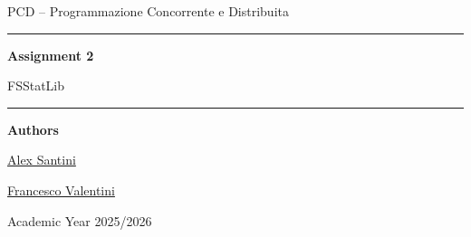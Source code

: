 \begin{titlepage}
    \centering
    \vspace*{2.2cm}

    {\Large PCD -- Programmazione Concorrente e Distribuita\par}
    \vspace{1.2cm}
    {\rule{0.82\textwidth}{0.5pt}\par}
    \vspace{0.9cm}
    {\huge\bfseries Assignment 2\par}
    \vspace{0.35cm}
    {\LARGE FSStatLib\par}
    \vspace{0.45cm}
    \vspace{0.9cm}
    {\rule{0.82\textwidth}{0.5pt}\par}

    \vspace{1.6cm}
    {\large\textbf{Authors}\par}
    \vspace{0.25cm}
    {\large \href{https://github.com/AlexSantini10}{Alex Santini}\par}
    {\large \href{https://github.com/Val0rous}{Francesco Valentini}\par}

    \vfill
    {\large Academic Year 2025/2026\par}
    {\large \todayFullUK\par}
\end{titlepage}
